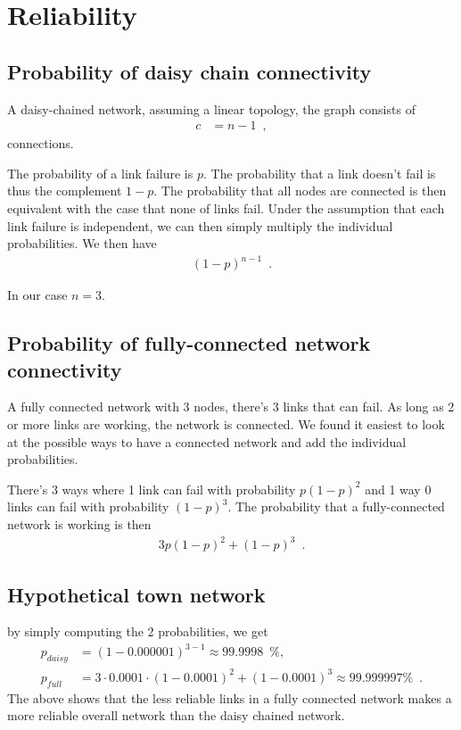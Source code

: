 
\section{Reliability}

\subsection{Probability of daisy chain connectivity}
A daisy-chained network, assuming a linear topology, the graph consists of
\begin{align}
    c &= n - 1 \enspace ,
\end{align}
connections.

The probability of a link failure is $p$. The probability that a link doesn't
fail is thus the complement $1 - p$. The probability that all nodes are connected
is then equivalent with the case that none of links fail. Under the assumption
that each link failure is independent, we can then simply multiply the individual
probabilities. We then have
\begin{align}
    (1 - p)^{n-1} \enspace .
\end{align}

In our case $n = 3$.

\subsection{Probability of fully-connected network connectivity}
A fully connected network with 3 nodes, there's 3 links that can fail. As long
as 2 or more links are working, the network is connected. We found it easiest
to look at the possible ways to have a connected network and add the
individual probabilities.

There's 3 ways where 1 link can fail with probability $p(1-p)^2$ and 1 way
0 links can fail with probability $(1-p)^3$. The probability that a
fully-connected network is working is then
\begin{align*}
3p(1-p)^2 + (1-p)^3 \enspace .
\end{align*}

\subsection{Hypothetical town network}

by simply computing the 2 probabilities, we get
\begin{align*}
p_{daisy} &= (1-0.000001)^{3-1} \approx 99.9998\enspace \% , \\
p_{full} &= 3 \cdot 0.0001 \cdot (1-0.0001)^2+(1-0.0001)^3 \approx 99.999997 \% \enspace .
\end{align*}
The above shows that the less reliable links in a fully connected network
makes a more reliable overall network than the daisy chained network.

